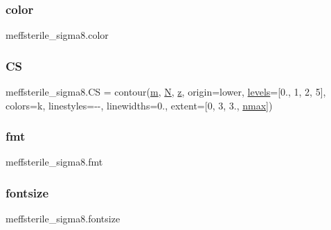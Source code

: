 \subsubsection{\texorpdfstring{color}{color}}
{\footnotesize\ttfamily meffsterile\+\_\+sigma8.\+color}

\mbox{\label{namespacemeffsterile__sigma8_a9be8a99b81f5f03d820f2297b21a3b5e}} 
\subsubsection{\texorpdfstring{CS}{CS}}
{\footnotesize\ttfamily meffsterile\+\_\+sigma8.\+CS = contour(\mbox{\hyperlink{namespacemeffsterile__sigma8_a8ea5ae4bdea4d8c602da2c2ced40553c}{m}}, \mbox{\hyperlink{namespacemeffsterile__sigma8_a299a4336c34055d97bda4a87b6b6bebd}{N}}, \mbox{\hyperlink{namespacemeffsterile__sigma8_a77b27eb1e7eb6240ae57f6578b094075}{z}}, origin=\textquotesingle{}lower\textquotesingle{}, \mbox{\hyperlink{namespacemeffsterile__sigma8_a2a791886c230da4f36eb2273cde1fe55}{levels}}=\mbox{[}0., 1, 2, 5\mbox{]}, colors=\textquotesingle{}k\textquotesingle{}, linestyles=\textquotesingle{}-\/-\/\textquotesingle{}, linewidths=0., extent=\mbox{[}0, 3, 3., \mbox{\hyperlink{namespacemeffsterile__sigma8_a543dfdcb6935567ea0f877c0ed581d7d}{nmax}}\mbox{]})}

\mbox{\label{namespacemeffsterile__sigma8_af9e07bb93ae562d01765624d8fc26a3d}} 
\subsubsection{\texorpdfstring{fmt}{fmt}}
{\footnotesize\ttfamily meffsterile\+\_\+sigma8.\+fmt}

\mbox{\label{namespacemeffsterile__sigma8_a27e7aab279d4e9bfc70b1154e47a89fb}} 
\subsubsection{\texorpdfstring{fontsize}{fontsize}}
{\footnotesize\ttfamily meffsterile\+\_\+sigma8.\+fontsize}

